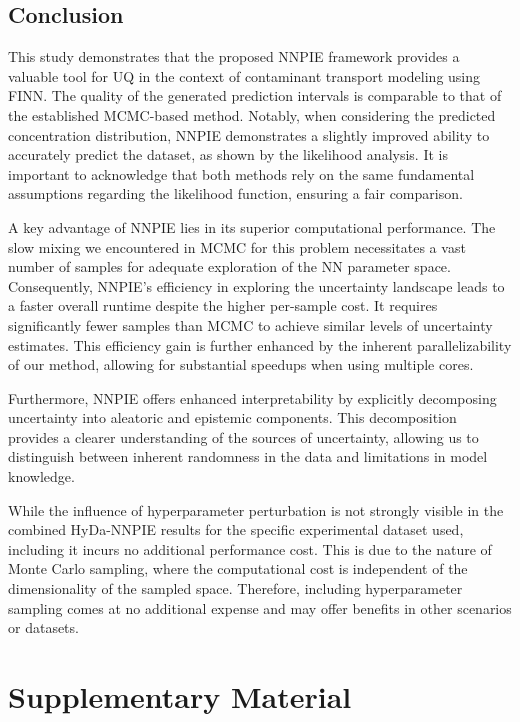 \section{Conclusion}
This study demonstrates that the proposed NNPIE framework provides a valuable tool for UQ in the context of contaminant transport modeling using FINN. The quality of the generated prediction intervals is comparable to that of the established MCMC-based method. Notably, when considering the predicted concentration distribution, NNPIE demonstrates a slightly improved ability to accurately predict the dataset, as shown by the likelihood analysis. It is important to acknowledge that both methods rely on the same fundamental assumptions regarding the likelihood function, ensuring a fair comparison.

A key advantage of NNPIE lies in its superior computational performance. The slow mixing we encountered in MCMC for this problem necessitates a vast number of samples for adequate exploration of the NN parameter space. Consequently, NNPIE's efficiency in exploring the uncertainty landscape leads to a faster overall runtime despite the higher per-sample cost. It requires significantly fewer samples than MCMC to achieve similar levels of uncertainty estimates. This efficiency gain is further enhanced by the inherent parallelizability of our method, allowing for substantial speedups when using multiple cores.

Furthermore, NNPIE offers enhanced interpretability by explicitly decomposing uncertainty into aleatoric and epistemic components. This decomposition provides a clearer understanding of the sources of uncertainty, allowing us to distinguish between inherent randomness in the data and limitations in model knowledge.

While the influence of hyperparameter perturbation is not strongly visible in the combined HyDa-NNPIE results for the specific experimental dataset used, including it incurs no additional performance cost. This is due to the nature of Monte Carlo sampling, where the computational cost is independent of the dimensionality of the sampled space. Therefore, including hyperparameter sampling comes at no additional expense and may offer benefits in other scenarios or datasets.




\appendix
\chapter{Supplementary Material}
